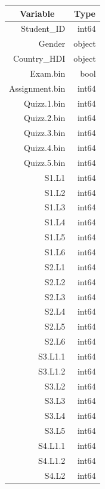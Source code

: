 \documentclass[12pt, a4paper, titlepage, table]{article}
\begin{document}
\begin{table}[H]
	\centering
	\fontsize{10}{12}\selectfont
	\begin{tabular}{|r|r|}
	\hline 
	\multicolumn{1}{|c|}{\textbf{Variable}}& 
	\multicolumn{1}{c|}{\textbf{Type}} \\
	\hline
   	Student\_ID&             int64\\      
   	Gender    &             object\\
	Country\_HDI&            object\\
	Exam.bin    &           bool\\   
	Assignment.bin&         int64\\  
	Quizz.1.bin&            int64 \\ 
	Quizz.2.bin&            int64 \\ 
	Quizz.3.bin&            int64 \\
	Quizz.4.bin&            int64 \\ 
	Quizz.5.bin&            int64 \\ 
	S1.L1      &            int64 \\ 
	S1.L2      &            int64 \\ 
	S1.L3      &            int64 \\ 
	S1.L4      &            int64 \\ 
	S1.L5      &            int64 \\
	S1.L6      &            int64 \\ 
	S2.L1      &            int64 \\ 
	S2.L2      &            int64 \\ 
	S2.L3      &            int64 \\ 
	S2.L4      &            int64 \\ 
	S2.L5      &            int64 \\ 
	S2.L6      &            int64 \\  
	S3.L1.1    &            int64 \\ 
	S3.L1.2    &            int64 \\ 
	S3.L2      &            int64 \\ 
	S3.L3      &            int64 \\ 
	S3.L4      &            int64 \\ 
	S3.L5      &            int64 \\ 
	S4.L1.1    &            int64 \\ 
	S4.L1.2    &            int64 \\ 
	S4.L2      &            int64 \\ 

\end{tabular}
\end{table}
\end{document}
